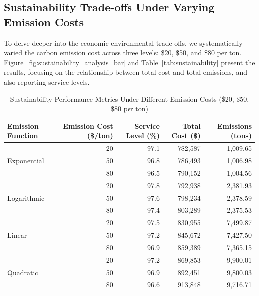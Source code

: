 \begin{table}[htbp]
\subsection{Sustainability Trade-offs Under Varying Emission Costs}
\label{subsec:sustainability_tradeoffs}
To delve deeper into the economic-environmental trade-offs, we systematically varied the carbon emission cost across three levels: \$20, \$50, and \$80 per ton. Figure~\ref{fig:sustainability_analysis_bar} and Table~\ref{tab:sustainability} present the results, focusing on the relationship between total cost and total emissions, and also reporting service levels.

\begin{table}[t!]
    \centering
    \caption{Sustainability Performance Metrics Under Different Emission Costs (\$20, \$50, \$80 per ton)}
    \label{tab:tab:sustainability}
    \begin{tabular}{lrrrr}
        \toprule
        Emission Function & Emission Cost (\$/ton) & Service Level (\%) & Total Cost (\$) & Emissions (tons) \\
        \midrule
        \multirow{3}{*}{Exponential} & 20 & 97.1 & 782,587 & 1,009.65 \\
        & 50 & 96.8 & 786,493 & 1,006.98 \\
        & 80 & 96.5 & 790,152 & 1,004.56 \\
        \midrule
        \multirow{3}{*}{Logarithmic} & 20 & 97.8 & 792,938 & 2,381.93 \\
        & 50 & 97.6 & 798,234 & 2,378.59 \\
        & 80 & 97.4 & 803,289 & 2,375.53 \\
        \midrule
        \multirow{3}{*}{Linear} & 20 & 97.5 & 830,955 & 7,499.87 \\
        & 50 & 97.2 & 845,672 & 7,427.50 \\
        & 80 & 96.9 & 859,389 & 7,365.15 \\
        \midrule
        \multirow{3}{*}{Quadratic} & 20 & 97.2 & 869,853 & 9,900.01 \\
        & 50 & 96.9 & 892,451 & 9,800.03 \\
        & 80 & 96.6 & 913,848 & 9,716.71 \\
        \bottomrule
    \end{tabular}
\end{table}




\end{table}
